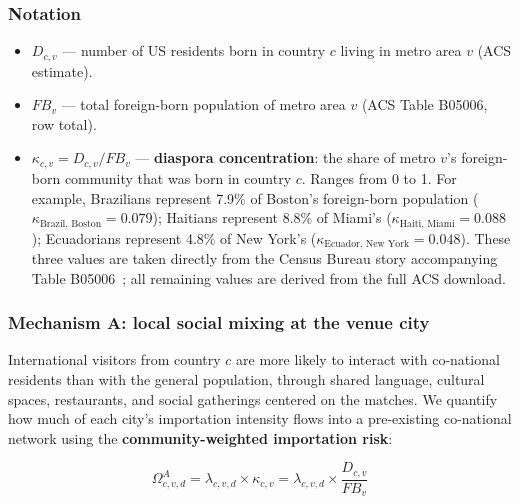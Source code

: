 \documentclass[12pt]{article}
\begin{document}
\subsubsection*{Notation}

\begin{itemize}
  \item $D_{c,v}$ --- number of US residents born in country $c$ living in
    metro area $v$ (ACS estimate).
  \item $\mathit{FB}_{v}$ --- total foreign-born population of metro area $v$
    (ACS Table B05006, row total).
  \item $\kappa_{c,v} = D_{c,v} / \mathit{FB}_{v}$ ---
    \textbf{diaspora concentration}: the share of metro $v$'s
    foreign-born community that was born in country $c$. Ranges from 0 to 1.
    For example, Brazilians represent 7.9\% of Boston's foreign-born
    population ($\kappa_{\text{Brazil, Boston}} = 0.079$); Haitians represent
    8.8\% of Miami's ($\kappa_{\text{Haiti, Miami}} = 0.088$); Ecuadorians
    represent 4.8\% of New York's ($\kappa_{\text{Ecuador, New York}} = 0.048$).
    These three values are taken directly from the Census Bureau story
    accompanying Table B05006~\cite{Census2026WC}; all remaining values are
    derived from the full ACS download.
\end{itemize}

\subsubsection*{Mechanism A: local social mixing at the venue city}

International visitors from country $c$ are more likely to interact with
co-national residents than with the general population, through shared language,
cultural spaces, restaurants, and social gatherings centered on the matches.
We quantify how much of each city's importation intensity flows into a
pre-existing co-national network using the \textbf{community-weighted
importation risk}:

\begin{equation}
  \Omega^A_{c,v,d} = \lambda_{c,v,d} \times \kappa_{c,v}
    = \lambda_{c,v,d} \times \frac{D_{c,v}}{\mathit{FB}_{v}}
  \label{eq:omegaA}
\end{equation}
\end{document}
